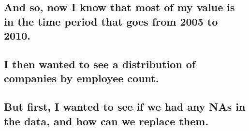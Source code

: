 \documentclass[]{article}
\begin{document}
\hypertarget{and-so-now-i-know-that-most-of-my-value-is-in-the-time-period-that-goes-from-2005-to-2010.}{%
\subsection{And so, now I know that most of my value is in the time
period that goes from 2005 to
2010.}\label{and-so-now-i-know-that-most-of-my-value-is-in-the-time-period-that-goes-from-2005-to-2010.}}

\hypertarget{i-then-wanted-to-see-a-distribution-of-companies-by-employee-count.}{%
\subsection{I then wanted to see a distribution of companies by employee
count.}\label{i-then-wanted-to-see-a-distribution-of-companies-by-employee-count.}}

\hypertarget{but-first-i-wanted-to-see-if-we-had-any-nas-in-the-data-and-how-can-we-replace-them.}{%
\subsection{But first, I wanted to see if we had any NAs in the data,
and how can we replace
them.}\label{but-first-i-wanted-to-see-if-we-had-any-nas-in-the-data-and-how-can-we-replace-them.}}
\end{document}
